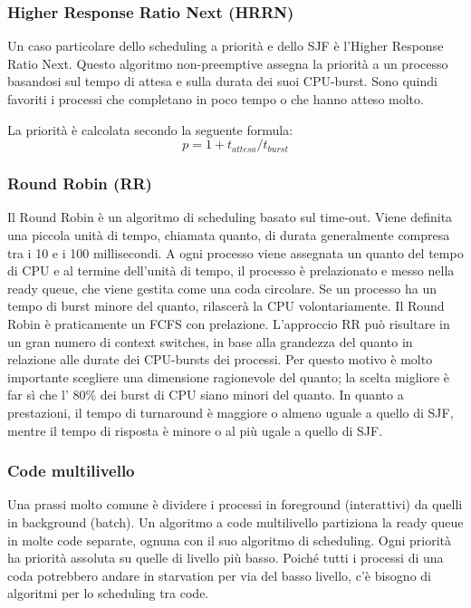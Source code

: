 \documentclass[a4paper]{article}
\begin{document}
\newpage
\subsubsection{Higher Response Ratio Next (HRRN)}
Un caso particolare dello scheduling a priorità e dello SJF è l'Higher Response Ratio Next. Questo algoritmo non-preemptive assegna la priorità a un processo basandosi sul tempo di attesa e sulla durata dei suoi CPU-burst. Sono quindi favoriti i processi che completano in poco tempo o che hanno atteso molto.

La priorità è calcolata secondo la seguente formula: \newline
$$
   p = 1 + t_{attesa}/t_{burst}
$$

\subsubsection{Round Robin (RR)}
Il Round Robin è un algoritmo di scheduling basato sul time-out. Viene definita una piccola unità di tempo, chiamata quanto, di durata generalmente compresa tra i 10 e i 100 millisecondi. A ogni processo viene assegnata un quanto del tempo di CPU e al termine dell'unità di tempo, il processo è prelazionato e messo nella ready queue, che viene gestita come una coda circolare. Se un processo ha un tempo di burst minore del quanto, rilascerà la CPU volontariamente. Il Round Robin è praticamente un FCFS con prelazione.
L'approccio RR può risultare in un gran numero di context switches, in base alla grandezza del quanto in relazione alle durate dei CPU-bursts dei processi. Per questo motivo è molto importante scegliere una dimensione ragionevole del quanto; la scelta migliore è far sì che l' 80\% dei burst di CPU siano minori del quanto.\newline
In quanto a prestazioni, il tempo di turnaround è maggiore o almeno uguale a quello di SJF, mentre il tempo di risposta è minore o al più ugale a quello di SJF.

\subsubsection{Code multilivello}
Una prassi molto comune è dividere i processi in foreground (interattivi) da quelli in background (batch). Un algoritmo a code multilivello partiziona la ready queue in molte code separate, ognuna con il suo algoritmo di scheduling. Ogni priorità ha priorità assoluta su quelle di livello più basso. Poiché tutti i processi di una coda potrebbero andare in starvation per via del basso livello, c'è bisogno di algoritmi per lo scheduling tra code.
\end{document}
